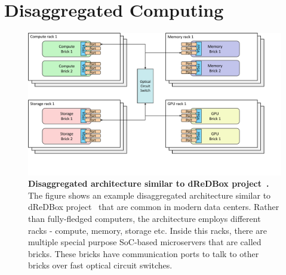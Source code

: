 \section{Disaggregated Computing}
\label{ch:background:disaggregated}



\begin{figure}[t]
  \centering
    \includegraphics[trim={0 2cm 2cm 0},clip,width=\linewidth]{chapters/background/figures/disaggregated.pdf}
    \caption[Disaggregated architecture similar to dReDBox project]{\textbf{Disaggregated architecture similar to dReDBox project~\cite{dis1}.} The figure shows an example disaggregated architecture similar to dReDBox project~\cite{dis1} that are common in modern data centers. Rather than fully-fledged computers, the architecture employs different racks - compute, memory, storage etc. Inside this racks, there are multiple special purpose SoC-based microservers that are called bricks. These bricks have communication ports to talk to other bricks over fast optical circuit switches.}
    \label{fig:disagg_bg}
\end{figure}

